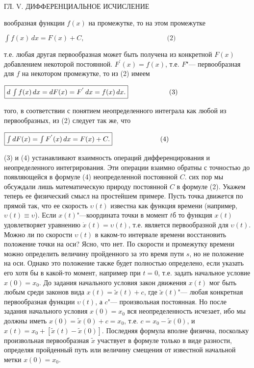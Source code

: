 \documentclass[a5paper, 16pt]{book}
\begin{document}
    \newpage

    \begin{center}
        \textsc{ГЛ. V. ДИФФЕРЕНЦИАЛЬНОЕ ИСЧИСЛЕНИЕ}
    \end{center}
    вообразная функции $f(x)$ на промежутке, то на этом промежутке
    \begin{flushright}
        $\int f(x) \, dx = F(x) + C, \qquad \qquad \qquad \qquad \qquad \qquad \textrm{(2)}$
    \end{flushright}
    т.е. любая другая первообразная может быть получена из конкретной $F(x)$ добавлением некоторой постоянной.
     $F ^ {'} (x) = f(x)$, т.е. $F \textbf{"---}$ первообразная для $f$ на некотором промежутке, то из (2) имеем
    \begin{flushright}
        $\fbox{$d\, \int f(x) \, dx = dF(x) = F ^ {'} \, dx = f(x) \, dx.$} \qquad \qquad \qquad \textrm{(3)}$
    \end{flushright}
     того, в соответствии с понятием неопределенного интеграла как любой из первообразных, из (2) следует так же, что
    \begin{flushright}
        $\fbox{$\int dF(x) = \int F ^ {'} (x) \, dx = F(x) + C.$} \quad \qquad \qquad \qquad \textrm{(4)}$
    \end{flushright}
     (3) и (4) устанавливают взаимность операций дифференцирования и неопределенного интегрирования. Эти операции взаимно обратны с точностью до появляющейся в формуле (4) неопределенной постоянной $C$.
     сих пор мы обсуждали лишь математическую природу постоянной $C$ в формуле (2). Укажем теперь ее физический смысл на простейшем примере. Пусть точка движется по прямой так, что ее скорость $\upsilon (t)$ известна как функция времени (например, $\upsilon (t) \equiv \upsilon$). Если $x(t) \textbf{"---}$координата точки в момент $t$б то функция $x(t)$ удовлетворяет уравнению $\dot x (t) = \upsilon (t)$, т.е. является первообразной для $\upsilon (t)$. Можно ли по скорости $\upsilon (t)$ в каком-то интервале времени восстановить положение точки на оси? Ясно, что нет. По скорости и промежутку времени можно определить величину пройденного за это время пути $s$, но не положение на оси. Однако это положение также будет полностью определено, если указать его хотя бы в какой-то момент, например при $t = 0$, т.е. задать начальное условие $x(0) = x_0$. До задания начального условия закон движения $x(t)$ мог быть любым среди законов вида $x(t) = \tilde x (t) + c$, где $\tilde x (t) \textbf{"---}$ любая конкретная первообразная функции $\upsilon (t)$, а $c \textbf{"---}$ произвольная постоянная. Но после задания начального условия $x(0) = x_0$ вся неопределенность исчезает, ибо мы должны иметь $x(0) = \tilde x (0) + c = x_0$, т.е. $c = x_0 - \tilde x (0)$, и $x(t) = x_0 + [\tilde x (t) - \tilde x (0)]$. Последняя формула вполне физична, поскольку произвольная первообразная $\tilde x$ участвует в формуле только в виде разности, определяя пройденный путь или величину смещения от известной начальной метки $x(0) = x_0$.
\end{document}
